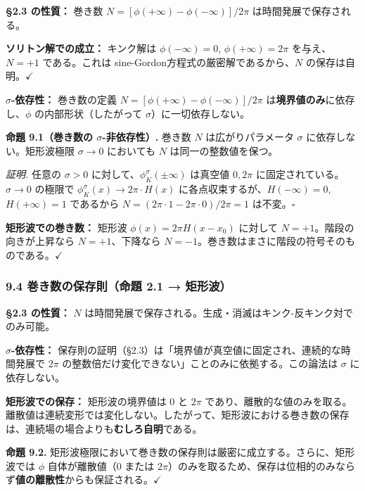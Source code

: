 \documentclass[a4paper,11pt]{ltjsarticle}
\begin{document}
\textbf{§2.3 の性質：} 巻き数
\(N = [\phi(+\infty) - \phi(-\infty)] / 2\pi\) は時間発展で保存される。

\textbf{ソリトン解での成立：} キンク解は \(\phi(-\infty) = 0\),
\(\phi(+\infty) = 2\pi\) を与え、\(N = +1\) である。これは
sine-Gordon方程式の厳密解であるから、\(N\) の保存は自明。\(\checkmark\)

\textbf{\(\sigma\)-依存性：} 巻き数の定義
\(N = [\phi(+\infty) - \phi(-\infty)] / 2\pi\)
は\textbf{境界値のみ}に依存し、\(\phi\) の内部形状（したがって
\(\sigma\)）に一切依存しない。

\textbf{命題 9.1（巻き数の \(\sigma\)-非依存性）.} 巻き数 \(N\)
は広がりパラメータ \(\sigma\) に依存しない。矩形波極限 \(\sigma \to 0\)
においても \(N\) は同一の整数値を保つ。

\emph{証明.} 任意の \(\sigma > 0\)
に対して、\(\phi_K^\sigma(\pm\infty)\) は真空値 \(0, 2\pi\)
に固定されている。\(\sigma \to 0\) の極限で
\(\phi_K^\sigma(x) \to 2\pi \cdot H(x)\)
に各点収束するが、\(H(-\infty) = 0\), \(H(+\infty) = 1\) であるから
\(N = (2\pi \cdot 1 - 2\pi \cdot 0)/2\pi = 1\) は不変。\(\square\)

\textbf{矩形波での巻き数：} 矩形波 \(\phi(x) = 2\pi H(x - x_0)\)
に対して \(N = +1\)。階段の向きが上昇なら \(N = +1\)、下降なら
\(N = -1\)。巻き数はまさに階段の符号そのものである。\(\checkmark\)

\subsubsection{9.4 巻き数の保存則（命題 2.1 →
矩形波）}\label{ux5dfbux304dux6570ux306eux4fddux5b58ux5247ux547dux984c-2.1-ux77e9ux5f62ux6ce2}

\textbf{§2.3 の性質：} \(N\)
は時間発展で保存される。生成・消滅はキンク-反キンク対でのみ可能。

\textbf{\(\sigma\)-依存性：}
保存則の証明（§2.3）は「境界値が真空値に固定され、連続的な時間発展で
\(2\pi\) の整数倍だけ変化できない」ことのみに依拠する。この論法は
\(\sigma\) に依存しない。

\textbf{矩形波での保存：} 矩形波の境界値は \(0\) と \(2\pi\)
であり、離散的な値のみを取る。離散値は連続変形では変化しない。したがって、矩形波における巻き数の保存は、連続場の場合よりも\textbf{むしろ自明}である。

\textbf{命題 9.2.}
矩形波極限において巻き数の保存則は厳密に成立する。さらに、矩形波では
\(\phi\) 自体が離散値（\(0\) または
\(2\pi\)）のみを取るため、保存は位相的のみならず\textbf{値の離散性}からも保証される。\(\checkmark\)
\end{document}
